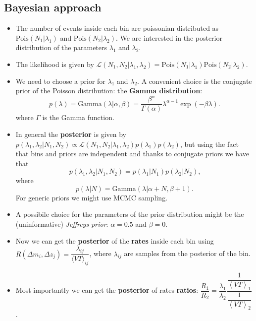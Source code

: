 \documentclass[12pt,a4paper]{article}
\begin{document}
\subsection{Bayesian approach}
\begin{itemize}
    \item The number of events inside each bin are poissonian distributed as \(\mathrm{Pois}(N_1 | \lambda_1)\) and \(\mathrm{Pois}(N_2 | \lambda_2)\). We are interested in the posterior distribution of the parameters \(\lambda_1\) and \(\lambda_2\).
    \item The likelihood is given by \(\mathcal{L}(N_1, N_2 | \lambda_1, \lambda_2) = \mathrm{Pois}(N_1 | \lambda_1) \mathrm{Pois}(N_2 | \lambda_2)\).
    \item We need to choose a prior for $\lambda_1$ and $\lambda_2$. A convenient choice is the conjugate prior of the Poisson distribution: the \textbf{Gamma distribution}: \begin{equation} \label{eq:Gamma_dist}
        p(\lambda) = \mathrm{Gamma}(\lambda | \alpha, \beta) = \dfrac{\beta^\alpha}{\Gamma(\alpha)} \lambda^{\alpha-1} \exp(-\beta\lambda) \text{.}
    \end{equation} where \(\Gamma\) is the Gamma function.
    \item In general the \textbf{posterior} is given by \(p(\lambda_1, \lambda_2 | N_1, N_2) \propto \mathcal{L}(N_1, N_2 | \lambda_1, \lambda_2) p(\lambda_1) p(\lambda_2)\), but using the fact that bins and priors are independent and thanks to conjugate priors we have that \begin{equation} \label{eq:joint_posterior}
        p(\lambda_1, \lambda_2 | N_1, N_2) = p(\lambda_1 | N_1) p(\lambda_2 | N_2) \text{,}
    \end{equation} where \begin{equation} \label{eq:posterior_lambda}
    p(\lambda | N) = \mathrm{Gamma}(\lambda | \alpha + N, \beta + 1) \text{.}
    \end{equation}
    For generic priors we might use MCMC sampling.
    \item A possibile choice for the parameters of the prior distribution might be the (uninformative) \textit{Jeffreys prior}: \(\alpha = 0.5\) and \(\beta = 0\).
    \item Now we can get the \textbf{posterior} of the \textbf{rates} inside each bin using \(R(\Delta m_i, \Delta z_j) = \dfrac{\lambda_{ij}}{\langle VT \rangle_{ij}}\), where $\lambda_{ij}$ are samples from the posterior of the bin.
    \item Most importantly we can get the \textbf{posterior} of rates \textbf{ratios}: \(\dfrac{R_1}{R_2} = \dfrac{\lambda_1}{\lambda_2}\dfrac{\dfrac{1}{\left\langle VT \right\rangle_1}}{\dfrac{1}{\left\langle VT \right\rangle_2}}\).

\end{itemize}
\end{document}
